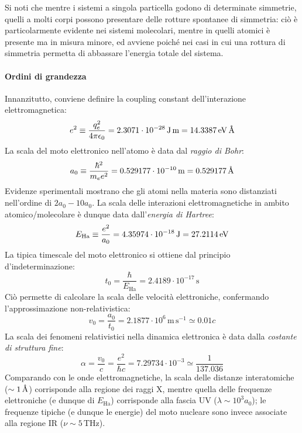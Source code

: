 Si noti che mentre i sistemi a singola particella godono di determinate simmetrie, quelli a molti corpi possono presentare delle rotture spontanee di simmetria: ciò è particolarmente evidente nei sistemi molecolari, mentre in quelli atomici è presente ma in misura minore, ed avviene poiché nei casi in cui una rottura di simmetria permetta di abbassare l'energia totale del sistema.

\paragraph{Ordini di grandezza}

Innanzitutto, conviene definire la coupling constant dell'interazione elettromagnetica:
\begin{equation*}
	e^2 \equiv \frac{q_e^2}{4\pi \epsilon_0} = 2.3071 \cdot 10^{-28} \,\text{J} \,\text{m} = 14.3387 \,\mathrm{eV} \,\text{\AA}
\end{equation*}
La scala del moto elettronico nell'atomo è data dal \textit{raggio di Bohr}:
\begin{equation*}
	a_0 \equiv \frac{\hbar^2}{m_e e^2} = 0.529177 \cdot 10^{-10} \,\text{m} = 0.529177 \,\text{\AA}
\end{equation*}
Evidenze sperimentali mostrano che gli atomi nella materia sono distanziati nell'ordine di $ 2a_0 - 10a_0 $. La scala delle interazioni elettromagnetiche in ambito atomico/molecolare è dunque data dall'\textit{energia di Hartree}:
\begin{equation*}
	E_\text{Ha} \equiv \frac{e^2}{a_0} = 4.35974 \cdot 10^{-18} \,\text{J} = 27.2114 \,\mathrm{eV}
\end{equation*}
La tipica timescale del moto elettronico si ottiene dal principio d'indeterminazione:
\begin{equation*}
	t_0 = \frac{\hbar}{E_\text{Ha}} = 2.4189 \cdot 10^{-17} \,\text{s}
\end{equation*}
Ciò permette di calcolare la scala delle velocità elettroniche, confermando l'approssimazione non-relativistica:
\begin{equation*}
	v_0 = \frac{a_0}{t_0} = 2.1877 \cdot 10^6 \,\text{m} \,\text{s}^{-1} \simeq 0.01 c
\end{equation*}
La scala dei fenomeni relativistici nella dinamica elettronica è data dalla \textit{costante di struttura fine}:
\begin{equation*}
	\alpha = \frac{v_0}{c} = \frac{e^2}{\hbar c} = 7.29734 \cdot 10^{-3} \simeq \frac{1}{137.036}
\end{equation*}
Comparando con le onde elettromagnetiche, la scala delle distanze interatomiche ($ \sim 1\,\text{\AA} $) corrisponde alla regione dei raggi X, mentre quella delle frequenze elettroniche (e dunque di $ E_\text{Ha} $) corrisponde alla fascia UV ($ \lambda \sim 10^3 a_0 $); le frequenze tipiche (e dunque le energie) del moto nucleare sono invece associate alla regione IR ($ \nu \sim 5 \,\text{THz} $).

